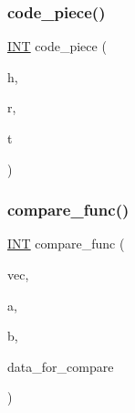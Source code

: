 \subsubsection{\texorpdfstring{code\+\_\+piece()}{code\_piece()}}
{\footnotesize\ttfamily \mbox{\hyperlink{galois_8h_a09fddde158a3a20bd2dcadb609de11dc}{I\+NT}} code\+\_\+piece (\begin{DoxyParamCaption}\item[{\mbox{\hyperlink{galois_8h_a09fddde158a3a20bd2dcadb609de11dc}{I\+NT}}}]{h,  }\item[{\mbox{\hyperlink{galois_8h_a09fddde158a3a20bd2dcadb609de11dc}{I\+NT}}}]{r,  }\item[{\mbox{\hyperlink{galois_8h_a09fddde158a3a20bd2dcadb609de11dc}{I\+NT}}}]{t }\end{DoxyParamCaption})}

\mbox{\label{pentomino__5x5_8_c_af532ec92afffcb63cd1f1180e96642d4}} 
\subsubsection{\texorpdfstring{compare\+\_\+func()}{compare\_func()}}
{\footnotesize\ttfamily \mbox{\hyperlink{galois_8h_a09fddde158a3a20bd2dcadb609de11dc}{I\+NT}} compare\+\_\+func (\begin{DoxyParamCaption}\item[{void $\ast$}]{vec,  }\item[{void $\ast$}]{a,  }\item[{\mbox{\hyperlink{galois_8h_a09fddde158a3a20bd2dcadb609de11dc}{I\+NT}}}]{b,  }\item[{void $\ast$}]{data\+\_\+for\+\_\+compare }\end{DoxyParamCaption})}

\mbox{\label{pentomino__5x5_8_c_aaefa22897e89567d877f6b1316586a5a}} 
